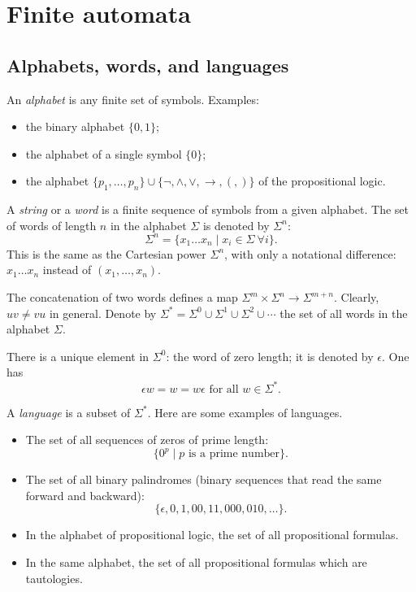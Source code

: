 \begin{page}
\setcounter{section}{1}
\setcounter{subsection}{1}
\setcounter{dfn}{0}
\label{portion:1009}

\section{Finite automata}

\end{page}

\begin{page}
\setcounter{section}{1}
\setcounter{subsection}{2}
\setcounter{dfn}{0}
\label{portion:1011}

\subsection{Alphabets, words, and languages}
An \emph{alphabet} is any finite set of symbols.
Examples:
\begin{itemize}
\item
the binary alphabet $\{0,1\}$;
\item
the alphabet of a single symbol $\{0\}$;
\item
the alphabet $\{p_1, \ldots, p_n\} \cup \{\neg, \wedge, \vee, \to, (, )\}$ of the propositional logic.
\end{itemize}

A \emph{string} or a \emph{word} is a finite sequence of symbols from a given alphabet.
The set of words of length $n$ in the alphabet $\Sigma$ is denoted by $\Sigma^n$:
\[
\Sigma^n = \{x_1 \ldots x_n \mid x_i \in \Sigma\ \forall i\}.
\]
This is the same as the Cartesian power $\Sigma^n$, with only a notational difference: $x_1 \ldots x_n$
instead of $(x_1, \ldots, x_n)$.

The concatenation of two words defines a map $\Sigma^m \times \Sigma^n \to \Sigma^{m+n}$.
Clearly, $uv \ne vu$ in general.
Denote by $\Sigma^* = \Sigma^0 \cup \Sigma^1 \cup \Sigma^2 \cup \cdots$ the set of all words in the alphabet $\Sigma$.

There is a unique element in $\Sigma^0$: the word of zero length; it is denoted by $\epsilon$.
One has
\[
\epsilon w = w = w\epsilon \text{ for all } w \in \Sigma^*.
\]

A \emph{language} is a subset of $\Sigma^*$.
Here are some examples of languages.

\begin{itemize}
\item
The set of all sequences of zeros of prime length:
\[
\{0^p \mid p \text{ is a prime number}\}.
\]
\item
The set of all binary palindromes (binary sequences that read the same forward and backward):
\[
\{\epsilon, 0, 1, 00, 11, 000, 010, \ldots\}.
\]
\item
In the alphabet of propositional logic, the set of all propositional formulas.
\item
In the same alphabet, the set of all propositional formulas which are tautologies.
\end{itemize}







\end{page}
